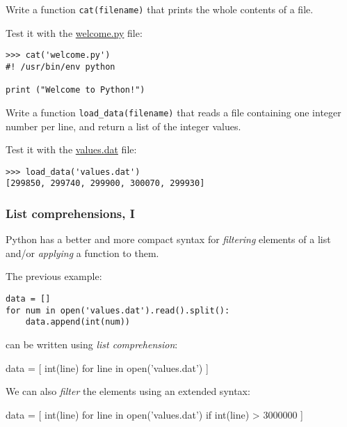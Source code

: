 \documentclass[english,serif,mathserif,xcolor=pdftex,dvipsnames,table]{beamer}
\begin{document}
\begin{frame}[fragile]
  \begin{exercise}
    Write a function \lstinline|cat(filename)| that prints the whole contents of a file.

    \+
    Test it with the
    \href{https://raw.github.com/gc3-uzh-ch/python-course/master/welcome.py}{welcome.py}
    file:
\begin{lstlisting}
>>> cat('welcome.py')
#! /usr/bin/env python

print ("Welcome to Python!")
\end{lstlisting}
  \end{exercise}

  \+
  \begin{exercise}
    Write a function \lstinline|load_data(filename)| that reads a file
    containing one integer number per line, and return a list of the
    integer values.

    \+
    Test it with the
    \href{https://raw.github.com/gc3-uzh-ch/python-course/master/values.dat}{values.dat}
    file:
\begin{lstlisting}
>>> load_data('values.dat')
[299850, 299740, 299900, 300070, 299930]
\end{lstlisting}
  \end{exercise}
\end{frame}

\begin{frame}[fragile]
  \frametitle{List comprehensions, I}
  Python has a better and more compact syntax for \emph{filtering} elements
  of a list and/or \emph{applying} a function to them.

  \+
  The previous example:
  \begin{lstlisting}
data = []
for num in open('values.dat').read().split():
    data.append(int(num))
  \end{lstlisting}
  \+
  can be written using \textit{list comprehension}:
  \begin{python}
data = [ int(line) for line in open('values.dat') ]
  \end{python}

  \+
  We can also \textit{filter} the elements using an extended syntax:

  \begin{python}
data = [ int(line) for line in open('values.dat')
         if int(line) > 3000000 ]
  \end{python}
\end{frame}
\end{document}
